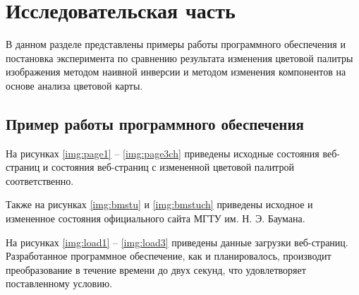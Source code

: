 \chapter{Исследовательская часть}

В данном разделе представлены примеры работы программного обеспечения и постановка эксперимента по сравнению результата изменения цветовой палитры изображения методом наивной инверсии и методом изменения компонентов на основе анализа цветовой карты.

\section{Пример работы программного обеспечения}

На рисунках \ref{img:page1} -- \ref{img:page3ch} приведены исходные состояния веб-страниц и состояния веб-страниц с измененной цветовой палитрой соответственно.

Также на рисунках \ref{img:bmstu} и \ref{img:bmstuch} приведены исходное и измененное состояния официального сайта МГТУ им. Н. Э. Баумана.

\clearpage









На рисунках \ref{img:load1} -- \ref{img:load3} приведены данные загрузки веб-страниц. Разработанное программное обеспечение, как и планировалось, производит преобразование в течение времени до двух секунд, что удовлетворяет поставленному условию.





